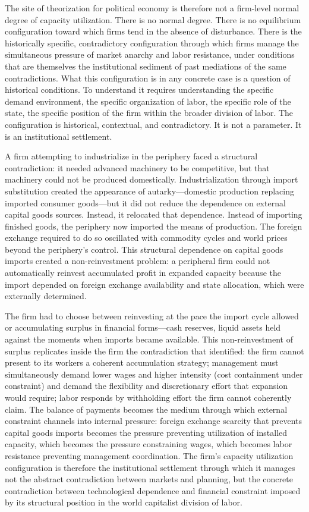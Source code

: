 The site of theorization for political economy is therefore not a firm-level normal degree of capacity utilization. There is no normal degree. There is no equilibrium configuration toward which firms tend in the absence of disturbance. There is the historically specific, contradictory configuration through which firms manage the simultaneous pressure of market anarchy and labor resistance, under conditions that are themselves the institutional sediment of past mediations of the same contradictions. What this configuration is in any concrete case is a question of historical conditions. To understand it requires understanding the specific demand environment, the specific organization of labor, the specific role of the state, the specific position of the firm within the broader division of labor. The configuration is historical, contextual, and contradictory. It is not a parameter. It is an institutional settlement.

A firm attempting to industrialize in the periphery faced a structural contradiction: it needed advanced machinery to be competitive, but that machinery could not be produced domestically. Industrialization through import substitution created the appearance of autarky—domestic production replacing imported consumer goods—but it did not reduce the dependence on external capital goods sources. Instead, it relocated that dependence. Instead of importing finished goods, the periphery now imported the means of production. The foreign exchange required to do so oscillated with commodity cycles and world prices beyond the periphery's control. This structural dependence on capital goods imports created a non-reinvestment problem: a peripheral firm could not automatically reinvest accumulated profit in expanded capacity because the import depended on foreign exchange availability and state allocation, which were externally determined.

The firm had to choose between reinvesting at the pace the import cycle allowed or accumulating surplus in financial forms—cash reserves, liquid assets held against the moments when imports became available. This non-reinvestment of surplus replicates inside the firm the contradiction that \citet{Vidal2022} identified: the firm cannot present to its workers a coherent accumulation strategy; management must simultaneously demand lower wages and higher intensity (cost containment under constraint) and demand the flexibility and discretionary effort that expansion would require; labor responds by withholding effort the firm cannot coherently claim. The balance of payments becomes the medium through which external constraint channels into internal pressure: foreign exchange scarcity that prevents capital goods imports becomes the pressure preventing utilization of installed capacity, which becomes the pressure constraining wages, which becomes labor resistance preventing management coordination. The firm's capacity utilization configuration is therefore the institutional settlement through which it manages not the abstract contradiction between markets and planning, but the concrete contradiction between technological dependence and financial constraint imposed by its structural position in the world capitalist division of labor.

